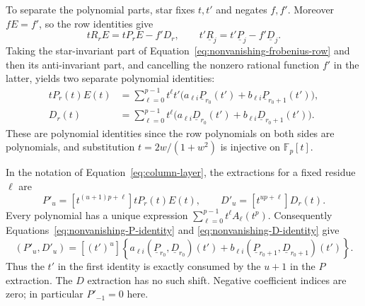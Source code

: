 To separate the polynomial parts, star fixes $t,t'$ and negates $f,f'$.
Moreover $fE=f'$, so the row identities give
\[
 tR_rE=tP_rE-f'D_r,
 \qquad t'\underline R_j=t'\underline P_j-f'\underline D_j.
\]
Taking the star-invariant part of
Equation~\eqref{eq:nonvanishing-frobenius-row} and then its anti-invariant
part, and cancelling the nonzero rational function $f'$ in the latter,
yields two separate polynomial identities:
\begin{align}
 tP_r(t)E(t)
 &=\sum_{\ell=0}^{p-1}t^\ell t'
       \bigl(a_{\ell i}\underline P_{r_0}(t')
              +b_{\ell i}\underline P_{r_0+1}(t')\bigr),
       \label{eq:nonvanishing-P-identity}\\
 D_r(t)
 &=\sum_{\ell=0}^{p-1}t^\ell
       \bigl(a_{\ell i}\underline D_{r_0}(t')
              +b_{\ell i}\underline D_{r_0+1}(t')\bigr).
       \label{eq:nonvanishing-D-identity}
\end{align}
These are polynomial identities since the row polynomials on both sides
are polynomials, and substitution $t=2w/(1+w^2)$ is injective on
$\mathbb F_p[t]$.

In the notation of Equation~\eqref{eq:column-layer}, the extractions for a
fixed residue $\ell$ are
\[
 P'_u=[t^{(u+1)p+\ell}]tP_r(t)E(t),\qquad
 D'_u=[t^{up+\ell}]D_r(t).
\]
Every polynomial has a unique expression
$\sum_{\ell=0}^{p-1}t^\ell A_\ell(t^p)$. Consequently
Equations~\eqref{eq:nonvanishing-P-identity} and
\eqref{eq:nonvanishing-D-identity} give
\begin{equation}\label{eq:nonvanishing-extracted-rows}
 (P'_u,D'_u)=[(t')^u]
 \left\{a_{\ell i}(\underline P_{r_0},\underline D_{r_0})(t')
        +b_{\ell i}(\underline P_{r_0+1},\underline D_{r_0+1})(t')\right\}.
\end{equation}
Thus the $t'$ in the first identity is exactly consumed by the $u+1$
in the $P$ extraction. The $D$ extraction has no such shift. Negative
coefficient indices are zero; in particular $P'_{-1}=0$ here.

